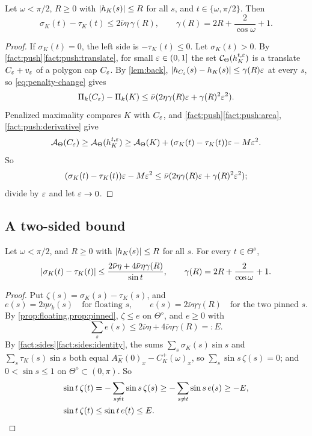 \begin{proposition}\label{prop:pinned}
Let $\omega<\pi/2$, $R\ge0$ with $\lvert h_K(s)\rvert\le R$ for all $s$, and
$t\in\{\omega,\pi/2\}$. Then
\[
  \sigma_K(t)-\tau_K(t)\le2\bar\nu\eta\,\gamma(R),\qquad \gamma(R)=2R
    +\frac2{\cos\omega}+1 .
\]
\end{proposition}

\begin{proof}
If $\sigma_K(t)=0$, the left side is $-\tau_K(t)\le0$. Let $\sigma_K(t)>0$. By
\cref{fact:push}\ref{fact:push:translate}, for small $\varepsilon\in(0,1]$ the set
$\mathcal{C}_\Theta(h_K^{t,\varepsilon})$ is a translate $C_\varepsilon+v_\varepsilon$ of a polygon cap
$C_\varepsilon$. By \cref{lem:back}, $\lvert h_{C_\varepsilon}(s)-h_K(s)\rvert\le \gamma(R)\varepsilon$ at
every $s$, so \eqref{eq:penalty-change} gives
\[
  \Pi_k(C_\varepsilon)-\Pi_k(K)\le\bar\nu(2\eta\gamma(R)\varepsilon+\gamma(R)^2\varepsilon^2).
\]
Penalized maximality compares $K$ with $C_\varepsilon$, and
\cref{fact:push}\ref{fact:push:area}, \ref{fact:push:derivative} give
\[
  \mathcal{A}_\Theta(C_\varepsilon)\ge\mathcal{A}_\Theta(h_K^{t,\varepsilon})\ge\mathcal{A}_\Theta(K)+(\sigma_K(t)
    -\tau_K(t))\varepsilon-M\varepsilon^2 .
\]
So
\[
  (\sigma_K(t)-\tau_K(t))\varepsilon-M\varepsilon^2\le\bar\nu(2\eta\gamma(R)\varepsilon
    +\gamma(R)^2\varepsilon^2);
\]
divide by $\varepsilon$ and let $\varepsilon\to0$.
\end{proof}

\subsection{A two-sided bound}

\begin{corollary}\label{cor:twosided}
Let $\omega<\pi/2$, and $R\ge0$ with $\lvert h_K(s)\rvert\le R$ for all $s$. For every
$t\in\Theta^\diamond$,
\[
  \lvert \sigma_K(t)-\tau_K(t)\rvert
    \le\frac{2\bar\nu\eta+4\bar\nu\eta\gamma(R)}{\sin t},\qquad \gamma(R)=2R
    +\frac2{\cos\omega}+1 .
\]
\end{corollary}

\begin{proof}
Put $\zeta(s)=\sigma_K(s)-\tau_K(s)$, and
\[
  e(s)=2\eta\nu_k(s)\quad\text{for floating }s,\qquad
  e(s)=2\bar\nu\eta\gamma(R)\quad\text{for the two pinned }s.
\]
By \cref{prop:floating,prop:pinned}, $\zeta\le e$ on $\Theta^\diamond$, and
$e\ge0$ with
\[
  \sum_se(s)\le2\bar\nu\eta+4\bar\nu\eta\gamma(R)=:E.
\]
By \cref{fact:sides}\ref{fact:sides:identity}, the sums
$\sum_s\sigma_K(s)\sin s$ and $\sum_s\tau_K(s)\sin s$ both equal
$A_K^-(0)_x-C_K^+(\omega)_x$, so $\sum_s\sin s\,\zeta(s)=0$; and $0<\sin s\le1$
on $\Theta^\diamond\subset(0,\pi)$. So
\begin{align*}
  \sin t\,\zeta(t)&=-\sum_{s\ne t}\sin s\,\zeta(s)\ge-\sum_{s\ne t}\sin s\,e(s)
    \ge-E,\\
  \sin t\,\zeta(t)&\le\sin t\,e(t)\le E .\qedhere
\end{align*}
\end{proof}
